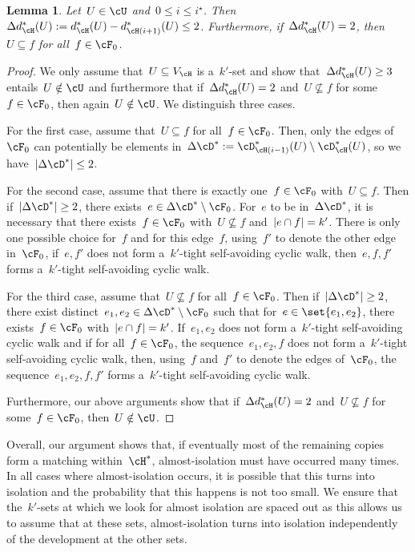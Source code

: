 \documentclass[11pt]{amsart}
\DeclarePairedDelimiter{\abs}{\lvert}{\rvert}
\newtheorem{lemma}[algocf]{Lemma}
\theoremstyle{definition}
\numberwithin{equation}{section}
\begin{document}
	\begin{lemma}\label{lemma: almost isolation must occur}
		Let~$U\in\cU$ and~$0\leq i\leq i^\star$.
		Then~$\Delta d^*_{\cH}(U):= d^*_{\cH}(U)-d^*_{\cH(i+1)}(U)\leq 2$.
		Furthermore, if~$\Delta d^*_{\cH}(U)= 2$, then~$U\subseteq f$ for all~$f\in\cF_0$.
	\end{lemma}
	\begin{proof}
		We only assume that~$U\subseteq V_\cH$ is a~$k'$-set and show that~$\Delta d^*_{\cH}(U)\geq 3$ entails~$U\notin\cU$ and furthermore that if~$\Delta d^*_{\cH}(U)=2$ and~$U\not\subseteq f$ for some~$f\in\cF_0$, then again~$U\notin\cU$.
		We distinguish three cases.
		
		For the first case, assume that~$U\subseteq f$ for all~$f\in\cF_0$.
		Then, only the edges of~$\cF_0$ can potentially be elements in~$\Delta\cD^*:=\cD^*_{\cH(i-1)}(U)\setminus \cD^*_\cH(U)$, so we have~$\abs{\Delta\cD^*}\leq 2$.
		
		For the second case, assume that there is exactly one~$f\in\cF_0$ with~$U\subseteq f$.
		Then if~$\abs{\Delta\cD^*}\geq 2$, there exists~$e\in\Delta\cD^*\setminus\cF_0$.
		For~$e$ to be in~$\Delta\cD^*$, it is necessary that there exists~$f\in\cF_0$ with~$U\not\subseteq f$ and~$\abs{e\cap f}=k'$.
		There is only one possible choice for~$f$ and for this edge~$f$, using~$f'$ to denote the other edge in~$\cF_0$, if~$e,f'$ does not form a~$k'$-tight self-avoiding cyclic walk, then~$e,f,f'$ forms a~$k'$-tight self-avoiding cyclic walk.
		
		For the third case, assume that~$U\not\subseteq f$ for all~$f\in\cF_0$.
		Then if~$\abs{\Delta\cD^*}\geq 2$, there exist distinct~$e_1,e_2\in\Delta\cD^*\setminus\cF_0$ such that for~$e\in\set{e_1,e_2}$, there exists~$f\in\cF_0$ with~$\abs{e\cap f}=k'$.
		If~$e_1,e_2$ does not form a~$k'$-tight self-avoiding cyclic walk and if for all~$f\in\cF_0$, the sequence~$e_1,e_2,f$ does not form a~$k'$-tight self-avoiding cyclic walk, then, using~$f$ and~$f'$ to denote the edges of~$\cF_0$, the sequence~$e_1,e_2,f,f'$ forms a~$k'$-tight self-avoiding cyclic walk.
		
		Furthermore, our above arguments show that if~$\Delta d^*_{\cH}(U)=2$ and~$U\not\subseteq f$ for some~$f\in\cF_0$, then~$U\notin \cU$.
	\end{proof}
	
	Overall, our argument shows that, if eventually most of the remaining copies form a matching within~$\cH^*$, almost-isolation must have occurred many times.
	In all cases where almost-isolation occurs, it is possible that this turns into isolation and the probability that this happens is not too small.
	We ensure that the~$k'$-sets at which we look for almost isolation are spaced out as this allows us to assume that at these sets, almost-isolation turns into isolation independently of the development at the other sets.
	
\end{document}
